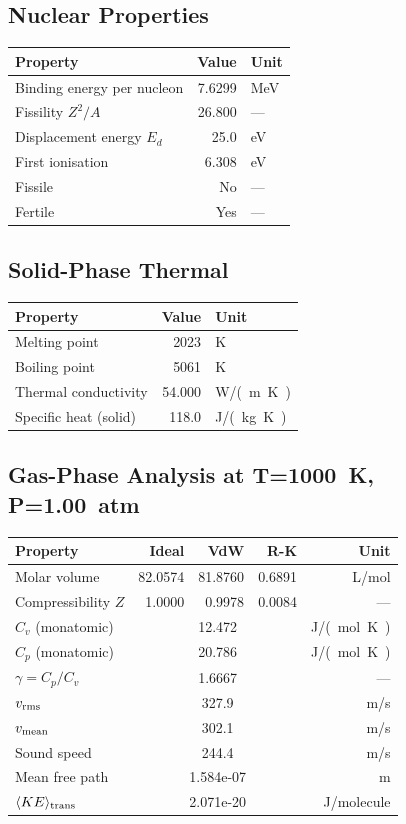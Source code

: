 \documentclass[11pt,a4paper]{article}
\begin{document}
\subsection{Nuclear Properties}
\begin{tabular}{lrl}
  \toprule
  Property & Value & Unit \\
  \midrule
  Binding energy per nucleon & 7.6299 & \si{MeV} \\
  Fissility $Z^2/A$ & 26.800 & --- \\
  Displacement energy $E_d$ & 25.0 & \si{eV} \\
  First ionisation & 6.308 & \si{eV} \\
  Fissile & No & --- \\
  Fertile & Yes & --- \\
  \bottomrule
\end{tabular}

\subsection{Solid-Phase Thermal}
\begin{tabular}{lrl}
  \toprule
  Property & Value & Unit \\
  \midrule
  Melting point & 2023 & \si{K} \\
  Boiling point & 5061 & \si{K} \\
  Thermal conductivity & 54.000 & \si{W/(m.K)} \\
  Specific heat (solid) & 118.0 & \si{J/(kg.K)} \\
  \bottomrule
\end{tabular}

\subsection{Gas-Phase Analysis at T=\SI{1000}{K}, P=\SI{1.00}{atm}}
\begin{tabular}{lrrrr}
  \toprule
  Property & Ideal & VdW & R-K & Unit \\
  \midrule
  Molar volume & 82.0574 & 81.8760 & 0.6891 & \si{L/mol} \\
  Compressibility $Z$ & 1.0000 & 0.9978 & 0.0084 & --- \\
  \midrule
  $C_v$ (monatomic) & \multicolumn{3}{c}{12.472} & \si{J/(mol.K)} \\
  $C_p$ (monatomic) & \multicolumn{3}{c}{20.786} & \si{J/(mol.K)} \\
  $\gamma = C_p/C_v$ & \multicolumn{3}{c}{1.6667} & --- \\
  $v_{\rm rms}$ & \multicolumn{3}{c}{327.9} & \si{m/s} \\
  $v_{\rm mean}$ & \multicolumn{3}{c}{302.1} & \si{m/s} \\
  Sound speed & \multicolumn{3}{c}{244.4} & \si{m/s} \\
  Mean free path & \multicolumn{3}{c}{1.584e-07} & \si{m} \\
  $\langle KE \rangle_{\rm trans}$ & \multicolumn{3}{c}{2.071e-20} & \si{J/molecule} \\
  \bottomrule
\end{tabular}
\end{document}
